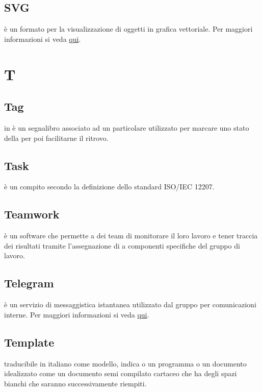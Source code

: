 \documentclass[12pt,a4paper]{article}
\begin{document}
\subsection{SVG} 
è un formato per la visualizzazione di oggetti in grafica vettoriale. Per maggiori informazioni si veda \href{https://it.wikipedia.org/wiki/Scalable_Vector_Graphics}{qui}.




\newpage

\section{T}


\subsection{Tag} 
in  è un segnalibro associato ad un particolare  utilizzato per marcare uno stato della  per poi facilitarne il ritrovo.

\subsection{Task} 
è un compito secondo la definizione dello standard ISO/IEC 12207.

\subsection{Teamwork} 
è un software che permette a dei team di monitorare il loro lavoro e tener traccia dei risultati tramite l'assegnazione di  a componenti specifiche del gruppo di lavoro.

\subsection{Telegram} 
è un servizio di messaggistica istantanea utilizzato dal gruppo per comunicazioni interne. Per maggiori informazioni si veda \href{https://it.wikipedia.org/wiki/Telegram_(software)}{qui}.

\subsection{Template} 
traducibile in italiano come modello, indica o un programma o un documento idealizzato come un documento semi compilato cartaceo che ha degli spazi bianchi che saranno successivamente riempiti.
\end{document}

